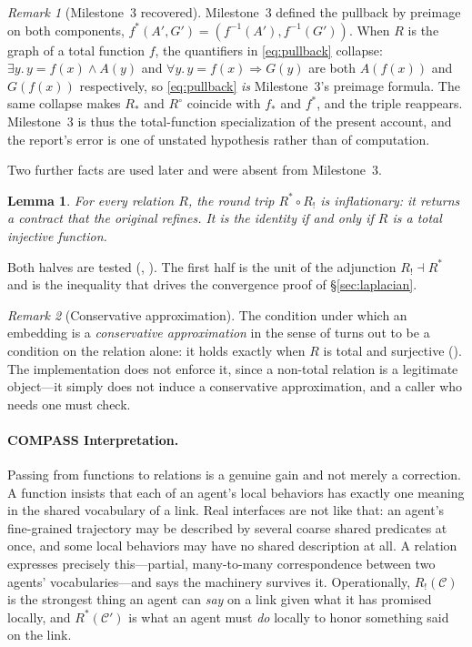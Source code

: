 \documentclass[11pt]{article}
\newtheorem{lemma}{Lemma}
\theoremstyle{definition}
\theoremstyle{remark}
\newtheorem{remark}{Remark}
\begin{document}
\begin{remark}[Milestone~3 recovered]
\label{rem:ms3-recovered}
Milestone~3 defined the pullback by preimage on both components,
$f^*(A', G') = (f^{-1}(A'), f^{-1}(G'))$.
When $R$ is the graph of a total function $f$, the quantifiers in \eqref{eq:pullback} collapse:
$\exists y.\, y = f(x) \wedge A(y)$ and $\forall y.\, y = f(x) \Rightarrow G(y)$ are both
$A(f(x))$ and $G(f(x))$ respectively, so \eqref{eq:pullback} \emph{is} Milestone~3's preimage
formula.
The same collapse makes $R_*$ and $R^{\circ}$ coincide with $f_*$ and $f^{*}$, and the triple
reappears.
Milestone~3 is thus the total-function specialization of the present account, and the report's
error is one of unstated hypothesis rather than of computation.
\end{remark}

Two further facts are used later and were absent from Milestone~3.

\begin{lemma}
\label{lem:roundtrip}
For every relation $R$, the round trip $R^{*} \circ R_!$ is inflationary: it returns a contract
that the original refines.
It is the identity if and only if $R$ is a total injective function.
\end{lemma}

Both halves are tested (,
).
The first half is the unit of the adjunction $R_! \dashv R^{*}$ and is the inequality that
drives the convergence proof of \S\ref{sec:laplacian}.

\begin{remark}[Conservative approximation]
\label{rem:conservative}
The condition under which an embedding is a \emph{conservative approximation} in the sense of
\citet{naikContractEmbeddingsLayered2025} turns out to be a condition on the relation
alone: it holds exactly when $R$ is total and surjective
().
The implementation does not enforce it, since a non-total relation is a legitimate object---it
simply does not induce a conservative approximation, and a caller who needs one must check.
\end{remark}

\paragraph{COMPASS Interpretation.}
Passing from functions to relations is a genuine gain and not merely a correction.
A function insists that each of an agent's local behaviors has exactly one meaning in the
shared vocabulary of a link.
Real interfaces are not like that: an agent's fine-grained trajectory may be described by
several coarse shared predicates at once, and some local behaviors may have no shared
description at all.
A relation expresses precisely this---partial, many-to-many correspondence between two agents'
vocabularies---and  says the machinery survives it.
Operationally, $R_!(\mathcal{C})$ is the strongest thing an agent can \emph{say} on a link given
what it has promised locally, and $R^{*}(\mathcal{C}')$ is what an agent must \emph{do} locally
to honor something said on the link.
\end{document}
